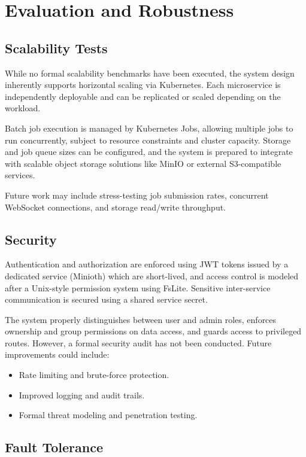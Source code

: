 \chapter{Evaluation and Robustness}
\label{Chapter-Evaluation-Robustness}

\section{Scalability Tests}

While no formal scalability benchmarks have been executed, the system design inherently supports horizontal scaling via Kubernetes. Each microservice is independently deployable and can be replicated or scaled depending on the workload.

Batch job execution is managed by Kubernetes Jobs, allowing multiple jobs to run concurrently, subject to resource constraints and cluster capacity. Storage and job queue sizes can be configured, and the system is prepared to integrate with scalable object storage solutions like MinIO or external S3-compatible services.

Future work may include stress-testing job submission rates, concurrent WebSocket connections, and storage read/write throughput.

\section{Security}

Authentication and authorization are enforced using JWT tokens issued by a dedicated service (Minioth) which are short-lived, and access control is modeled after a Unix-style permission system using FsLite. Sensitive inter-service communication is secured using a shared service secret.

The system properly distinguishes between user and admin roles, enforces ownership and group permissions on data access, and guards access to privileged routes. However, a formal security audit has not been conducted. Future improvements could include:

\begin{itemize}
    \item Rate limiting and brute-force protection.
    \item Improved logging and audit trails.
    \item Formal threat modeling and penetration testing.
\end{itemize}

\section{Fault Tolerance}

